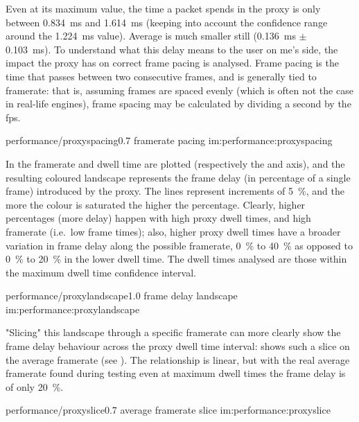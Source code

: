 Even at its maximum value, the time a packet spends in the proxy is only between \SI{0,834}{\milli\second} and \SI{1,614}{\milli\second} (keeping into account the confidence range around the \SI{1,224}{\milli\second} value). Average is much smaller still (\SI{0,136}{\milli\second} $\pm$ \SI{0,103}{\milli\second}). To understand what this delay means to the user on \gls{me}'s side, the impact the proxy has on correct frame pacing is analysed. Frame pacing is the time that passes between two consecutive frames, and is generally tied to \gls{framerate}: that is, assuming frames are spaced evenly (which is often not the case in real-life engines), frame spacing may be calculated by dividing a second by the \gls{fps}.

\begin{image}
	{performance/proxyspacing}{0.7}
	{\gls{framerate} pacing}
	{im:performance:proxyspacing}
	{}
	{}
\end{image}

In  the \gls{framerate} and dwell time are plotted (respectively the  and  axis), and the resulting coloured landscape represents the frame delay (in percentage of a single frame) introduced by the proxy. The lines represent increments of \SI{5}{\percent}, and the more the colour is saturated the higher the percentage. Clearly, higher percentages (more delay) happen with high proxy dwell times, and high \gls{framerate} (i.e.\ low frame times); also, higher proxy dwell times have a broader variation in frame delay along the possible \gls{framerate}, \SI{0}{\percent} to \SI{40}{\percent} as opposed to \SI{0}{\percent} to \SI{20}{\percent} in the lower dwell time. The dwell times analysed are those within the maximum dwell time confidence interval.

\begin{image}
	{performance/proxylandscape}{1.0}
	{frame delay landscape}
	{im:performance:proxylandscape}
	{}
	{}
\end{image}

"Slicing" this landscape through a specific \gls{framerate} can more clearly show the frame delay behaviour across the proxy dwell time interval:  shows such a slice on the average \gls{framerate} (see ). The relationship is linear, but with the real average framerate found during testing even at maximum dwell times the frame delay is of only \SI{20}{\percent}.

\begin{image}
	{performance/proxyslice}{0.7}
	{average \gls{framerate} slice}
	{im:performance:proxyslice}
	{}
	{}
\end{image}

